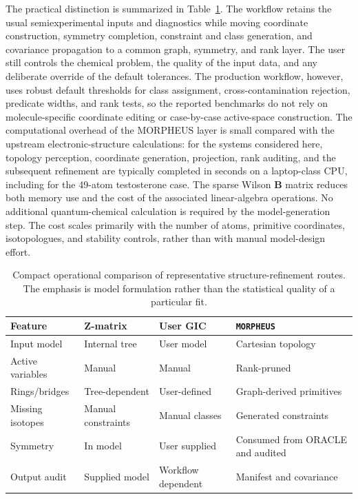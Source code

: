 \documentclass[aip,jcp,reprint,longbibliography,floatfix]{revtex4-2}
\begin{document}
The practical distinction is summarized in Table~\ref{tab:workflow-comparison}.
The workflow retains the usual semiexperimental inputs and diagnostics while
moving coordinate construction, symmetry completion, constraint and class
generation, and covariance propagation to a common graph, symmetry, and rank
layer. The user still controls the chemical problem, the quality of the input
data, and any deliberate override of the default tolerances. The production
workflow, however, uses robust default thresholds for class assignment,
cross-contamination rejection, predicate widths, and rank tests, so the
reported benchmarks do not rely on molecule-specific coordinate editing or
case-by-case active-space construction.
The computational overhead of the MORPHEUS layer is small compared with
the upstream electronic-structure calculations: for the systems considered
here, topology perception, coordinate generation, projection, rank auditing,
and the subsequent refinement are typically completed in seconds on a
laptop-class CPU, including for the 49-atom testosterone case. The sparse
Wilson $\mathbf{B}$ matrix reduces both memory use and the cost of the
associated linear-algebra operations. No additional quantum-chemical
calculation is required by the model-generation step. The cost scales
primarily with the number of atoms, primitive coordinates, isotopologues, and
stability controls, rather than with manual model-design effort.

\begin{table}
\caption{Compact operational comparison of representative
structure-refinement routes. The emphasis is model formulation rather than the
statistical quality of a particular fit.}
\label{tab:workflow-comparison}
\footnotesize
\setlength{\tabcolsep}{5pt}
\begin{tabular}{@{}llll@{}}
\toprule
Feature & Z-matrix & User GIC & \texttt{MORPHEUS} \\
\midrule
Input model & Internal tree & User model & Cartesian topology \\
Active variables & Manual & Manual & Rank-pruned \\
Rings/bridges & Tree-dependent & User-defined & Graph-derived primitives \\
Missing isotopes & Manual constraints & Manual classes & Generated constraints \\
Symmetry & In model & User supplied & Consumed from ORACLE and audited \\
Output audit & Supplied model & Workflow dependent & Manifest and covariance \\
\bottomrule
\end{tabular}
\end{table}
\end{document}
